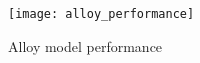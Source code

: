 \begin{figure}[H]
    \centering
    \texttt{[image: alloy\_performance]}
    \caption{Alloy model performance}
    \label{fig:alloy_Performance}
\end{figure}